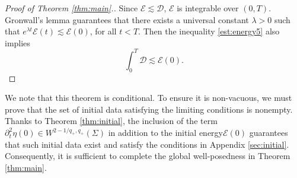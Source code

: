 \documentclass[letterpaper,reqno,10pt,twoside]{amsart}
\theoremstyle{definition}
\theoremstyle{remark}
\def\p{\partial}
\begin{document}
\begin{proof}[Proof of Theorem \ref{thm:main}.]
			Since $\mathcal{E}\lesssim \mathcal{D}$, $\mathcal{E}$ is integrable over $(0,T)$. Gronwall's lemma guarantees that there exists a universal constant $\lambda>0$ such that
			$
			e^{\lambda t}\mathcal{E}(t)\lesssim\mathcal{E}(0)$,
			for all $t<T$. Then the inequality \eqref{est:energy5} also implies
			\[
			\int_0^T\mathcal{D}\lesssim\mathcal{E}(0).
			\] 
		\end{proof}
		
		We note that this theorem is conditional. To ensure it is non-vacuous, we must prove  that the set of initial data satisfying the limiting conditions is nonempty. Thanks to Theorem \ref{thm:initial}, the inclusion of the term $\p_t^2\eta(0)\in W^{2-1/q_+,q_+}(\Sigma)$ in addition to the initial energy$\mathcal{E}(0)$ guarantees that such initial data exist and satisfy the conditions in Appendix \ref{sec:initial}. Consequently, it is sufficient to complete the global well-posedness in Theorem \ref{thm:main}.
		
\end{document}
